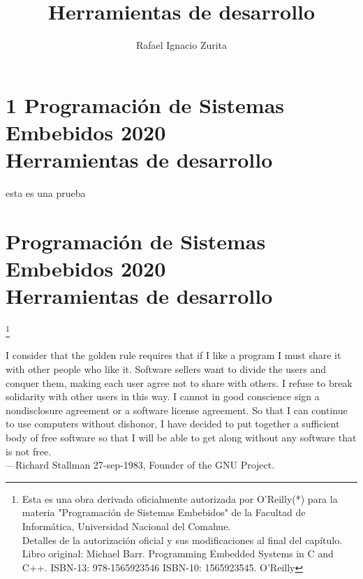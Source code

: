 \documentclass[output=paper, 
colorlinks,
citecolor=brown,
newtxmath
]{langscibook}
\author{Rafael Ignacio Zurita\affiliation{Universidad Nacional del Comahue}}
\title{Herramientas de desarrollo}
\begin{document}

\chapterfont{\Large\color{LightBlue}} 
\chapter*{1 Programación de Sistemas Embebidos 2020\\ Herramientas de desarrollo}
esta es una prueba
{\def\addcontentsline#1#2#3{}\maketitle}

\chapter*{Programación de Sistemas Embebidos 2020\\ Herramientas de desarrollo}

\begingroup
\let\clearpage\relax
\cleardoublepage
\hypersetup{linkcolor=blue}
\tableofcontents*
\endgroup


\footnote{\scriptsize\normalfont Esta es una obra derivada oficialmente autorizada por O'Reilly(*) para la materia "Programación de Sistemas Embebidos" de la Facultad de Informática, Universidad Nacional del Comahue. \\ Detalles de la autorización oficial y sus modificaciones al final del capítulo. \\ Libro original: Michael Barr. Programming Embedded Systems in C and C++. ISBN-13: 978-1565923546
ISBN-10: 1565923545. O'Reilly }

{\def\addcontentsline#1#2#3{}\maketitle}


\setcounter{page}{1}


\hfill\begin{minipage}{0.8\linewidth} \footnotesize
I consider that the golden rule requires that if I like a program I 
must share it with other people who like it. 
Software sellers want to divide the users and conquer them, making 
each user agree not to share with others. I refuse to break solidarity 
with other users in this way. I cannot in good conscience sign a
nondisclosure agreement or a software license agreement. 
So that I can continue to use computers
without dishonor, I have decided to put together a sufficient body of free software so that I will be able
to get along without any software that is not free.\\
—Richard Stallman 27-sep-1983, Founder of the GNU Project.
\end{minipage}
\end{document}
